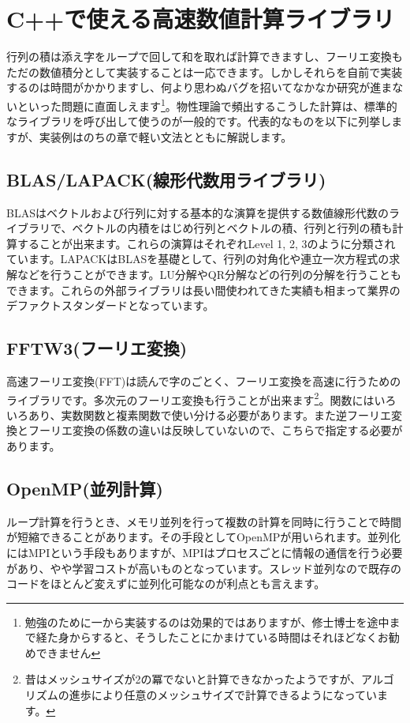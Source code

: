 \documentclass[12pt]{jreport}
\begin{document}
\section{C++で使える高速数値計算ライブラリ}
行列の積は添え字をループで回して和を取れば計算できますし、フーリエ変換もただの数値積分として実装することは一応できます。しかしそれらを自前で実装するのは時間がかかりますし、何より思わぬバグを招いてなかなか研究が進まないといった問題に直面しえます\footnote[2]{勉強のために一から実装するのは効果的ではありますが、修士博士を途中まで経た身からすると、そうしたことにかまけている時間はそれほどなくお勧めできません}。物性理論で頻出するこうした計算は、標準的なライブラリを呼び出して使うのが一般的です。代表的なものを以下に列挙しますが、実装例はのちの章で軽い文法とともに解説します。

\subsection{BLAS/LAPACK(線形代数用ライブラリ)}
BLASはベクトルおよび行列に対する基本的な演算を提供する数値線形代数のライブラリで、ベクトルの内積をはじめ行列とベクトルの積、行列と行列の積も計算することが出来ます。これらの演算はそれぞれLevel 1, 2, 3のように分類されています。LAPACKはBLASを基礎として、行列の対角化や連立一次方程式の求解などを行うことができます。LU分解やQR分解などの行列の分解を行うこともできます。これらの外部ライブラリは長い間使われてきた実績も相まって業界のデファクトスタンダードとなっています。

\subsection{FFTW3(フーリエ変換)}
高速フーリエ変換(FFT)は読んで字のごとく、フーリエ変換を高速に行うためのライブラリです。多次元のフーリエ変換も行うことが出来ます\footnote[1]{昔はメッシュサイズが2の冪でないと計算できなかったようですが、アルゴリズムの進歩により任意のメッシュサイズで計算できるようになっています。}。関数にはいろいろあり、実数関数と複素関数で使い分ける必要があります。また逆フーリエ変換とフーリエ変換の係数の違いは反映していないので、こちらで指定する必要があります。

\subsection{OpenMP(並列計算)}
ループ計算を行うとき、メモリ並列を行って複数の計算を同時に行うことで時間が短縮できることがあります。その手段としてOpenMPが用いられます。並列化にはMPIという手段もありますが、MPIはプロセスごとに情報の通信を行う必要があり、やや学習コストが高いものとなっています。スレッド並列なので既存のコードをほとんど変えずに並列化可能なのが利点とも言えます。
\end{document}
